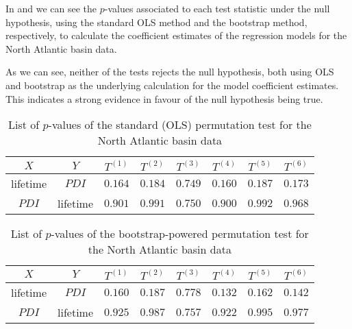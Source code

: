 In  and  we can see the $p$-values associated to each test statistic under the null hypothesis, using the standard OLS method and the bootstrap method, respectively, to calculate the coefficient estimates of the regression models for the North Atlantic basin data.

As we can see, neither of the tests rejects the null hypothesis, both using OLS and bootstrap as the underlying calculation for the model coefficient estimates. This indicates a strong evidence in favour of the null hypothesis being true.
\begin{table}[H]
	\centering
	\begin{tabular}{cccccccc}
	\toprule
	\toprule
	$X$  & $Y$       & $T^{(1)}$ & $T^{(2)}$ & $T^{(3)}$ & $T^{(4)}$ & $T^{(5)}$ & $T^{(6)}$ \\
	\midrule
	lifetime & $PDI$ & $0.164$ & $0.184$ & $0.749$ & $0.160$ & $0.187$ & $0.173$ \\
	$PDI$ & lifetime & $0.901$ & $0.991$ & $0.750$ & $0.900$ & $0.992$ & $0.968$ \\
	\bottomrule
	\end{tabular}
	\caption{List of $p$-values of the standard (OLS) permutation test for the North Atlantic basin data}
	\label{tab:perm-natl-ols-p-vals}
\end{table}

\begin{table}[H]
	\centering
	\begin{tabular}{cccccccc}
	\toprule
	\toprule
	$X$  & $Y$       & $T^{(1)}$ & $T^{(2)}$ & $T^{(3)}$ & $T^{(4)}$ & $T^{(5)}$ & $T^{(6)}$ \\
	\midrule
	lifetime & $PDI$ & $0.160$ & $0.187$ & $0.778$ & $0.132$ & $0.162$ & $0.142$ \\
	$PDI$ & lifetime & $0.925$ & $0.987$ & $0.757$ & $0.922$ & $0.995$ & $0.977$ \\
	\bottomrule
	\end{tabular}
	\caption{List of $p$-values of the bootstrap-powered permutation test for the North Atlantic basin data}
	\label{tab:perm-natl-boot-p-vals}
\end{table}


